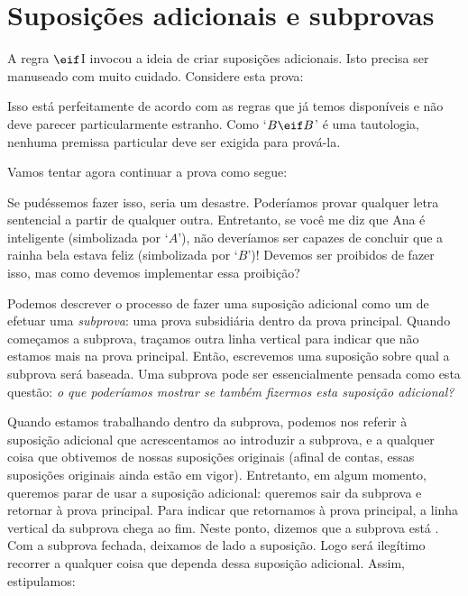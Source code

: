 \label{HSproof}
\begin{fitchproof}
	\open
	\close
\end{fitchproof}


\section{Suposições adicionais  e subprovas}
A regra $\eif$I invocou a ideia de criar  suposições adicionais.   Isto precisa ser manuseado com muito cuidado. Considere esta prova:
\begin{fitchproof}
	\open
		 
	\close
\end{fitchproof}
Isso está perfeitamente de acordo com as regras  que já temos disponíveis e não deve parecer particularmente estranho.   Como `$B \eif B$'  é uma tautologia, nenhuma premissa particular deve ser exigida para prová-la.

Vamos tentar agora continuar a prova como segue: 


\begin{fitchproof}
	\open
		 
	\close
	 
	 
\end{fitchproof}
Se pudéssemos fazer isso, seria um desastre. Poderíamos provar qualquer  letra sentencial a partir de qualquer outra. Entretanto, se  você me diz que Ana é inteligente  (simbolizada por `$A$'),  não deveríamos ser capazes de concluir que a rainha bela estava feliz (simbolizada por `$B$')!   Devemos ser proibidos de fazer isso, mas como devemos implementar essa proibição?

Podemos descrever o processo de fazer uma suposição adicional como um de efetuar  uma \emph{subprova}: uma prova subsidiária dentro da prova principal. Quando começamos a subprova, traçamos outra linha vertical para indicar que não estamos mais na prova principal. Então, escrevemos uma suposição sobre qual a subprova será baseada.  Uma subprova pode ser essencialmente pensada como esta questão: \emph{o que poderíamos mostrar se também fizermos esta suposição adicional?}

Quando estamos trabalhando dentro da subprova, podemos nos referir à suposição adicional que acrescentamos ao introduzir a subprova,  e a qualquer coisa que obtivemos de nossas suposições originais (afinal de contas, essas suposições originais ainda estão em vigor). Entretanto, em algum momento,  queremos parar de usar a suposição adicional: queremos sair da subprova e retornar à prova principal. Para indicar que retornamos à prova principal, a linha vertical da subprova chega ao fim.  Neste ponto, dizemos que a subprova está . Com a subprova fechada, deixamos de lado a suposição.  Logo será ilegítimo recorrer a qualquer coisa que dependa dessa suposição adicional. Assim, estipulamos:



